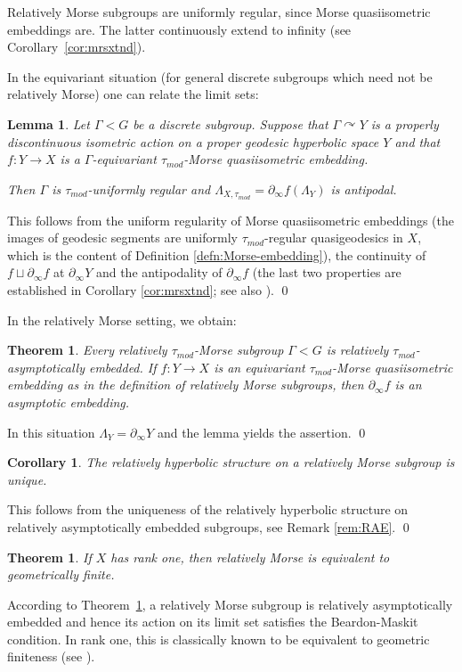 \documentclass[12pt]{article}
\theoremstyle{boldplain}
\newtheorem{cor}[equation]{Corollary}
\newtheorem{lem}[equation]{Lemma}
\newtheorem{thm}[equation]{Theorem}
\theoremstyle{bolddefinition}
\numberwithin{equation}{section}
\def\Ga{\Gamma}
\def\La{\Lambda}
\def\acts{\curvearrowright}
\def\geo{\partial_{\infty}}
\def\LaXt{\Lambda_{X,\tau_{mod}}}
\def\taumod{\tau_{mod}}
\def\mini{\scriptsize}
\begin{document}
{\mini Relatively Morse subgroups are uniformly regular, since Morse quasiisometric embeddings are.
The latter continuously extend to infinity (see Corollary~\ref{cor:mrsxtnd}).}

In the equivariant situation (for general discrete subgroups which need not be relatively Morse)
one can relate the limit sets:
\begin{lem}\label{lem:RM-RAE}
Let $\Ga<G$ be a discrete subgroup. 
Suppose that $\Ga\acts Y$ is a properly discontinuous isometric action on a proper geodesic hyperbolic space $Y$ 
and that $f: Y\to X$ is a $\Ga$-equivariant $\taumod$-Morse quasiisometric embedding.

Then $\Ga$ is $\taumod$-uniformly regular 
and $\LaXt=\geo f(\La_Y)$ is antipodal.
\end{lem}
\proof
This follows from the uniform regularity of Morse quasiisometric embeddings ({the images of geodesic segments are uniformly $\taumod$-regular quasigeodesics in $X$, which is the content of Definition \ref{defn:Morse-embedding}}), 
the continuity of $f\sqcup\geo f$ at $\geo Y$ and the antipodality of $\geo f$ ({the last two properties are established in Corollary \ref{cor:mrsxtnd}; see also \cite[Theorem 6.14]{mlem}}).
\qed

\medskip
In the relatively Morse setting, we obtain:
\begin{thm}
\label{thm:RM->UR}
Every relatively $\taumod$-Morse subgroup $\Ga< G$ is relatively $\taumod$-asymptotically embedded. 
If $f: Y\to X$ is an equivariant $\taumod$-Morse quasiisometric embedding as in the definition of relatively Morse subgroups,
then $\geo f$ is an asymptotic embedding.
\end{thm}
\proof 
In this situation 
$\La_Y=\geo Y$ and the lemma yields the assertion. 
\qed

\begin{cor}
\label{cor:uniqueness} 
The relatively hyperbolic structure on a relatively Morse subgroup is unique. 
\end{cor}
\proof This follows from the uniqueness of the relatively hyperbolic structure on relatively asymptotically embedded subgroups, {see Remark \ref{rem:RAE}}. \qed 


\begin{thm}
\label{thm:RM=GF}
If $X$ has rank one, then relatively Morse is equivalent to geometrically finite.
\end{thm}
\proof 
According to Theorem~\ref{thm:RM->UR}, 
a relatively Morse subgroup is relatively asymptotically embedded 
and hence its action on its limit set satisfies the Beardon-Maskit condition.
In rank one, this is classically known to be equivalent to geometric finiteness (see \cite{Bowditch}). 
\end{document}
